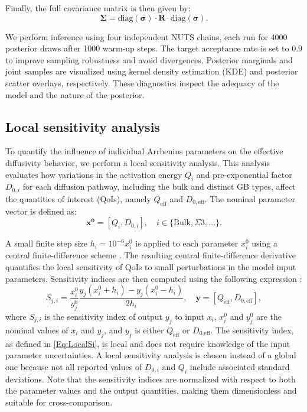 \documentclass[%
preprint,
amsmath,amssymb,
aps,
]{revtex4-2}
\newcommand{\?}{\stackrel{?}{=}}
\begin{document}
Finally, the full covariance matrix is then given by:
\begin{equation}
\boldsymbol{\Sigma} = \mathrm{diag}(\boldsymbol{\sigma}) \cdot \mathbf{R} \cdot \mathrm{diag}(\boldsymbol{\sigma}).
\end{equation}

We perform inference using four independent NUTS chains, each run for 4000 posterior draws after 1000 warm-up steps. The target acceptance rate is set to 0.9 to improve sampling robustness and avoid divergences. Posterior marginals and joint samples are visualized using kernel density estimation (KDE) \cite{Smith2014} and posterior scatter overlays, respectively. These diagnostics inspect the adequacy of the model and the nature of the posterior.


\subsection{Local sensitivity analysis}

To quantify the influence of individual Arrhenius parameters on the effective diffusivity behavior, we perform a local sensitivity analysis. This analysis evaluates how variations in the activation energy \( Q_i \) and pre-exponential factor \( D_{0,i} \) for each diffusion pathway, including the bulk and distinct GB types, affect the quantities of interest (QoIs), namely $Q_{\text{eff}}$ and $D_{0,\text{eff}}$. The nominal parameter vector is defined as:
\begin{equation}
\mathbf{x^0} = [Q_i, D_{0,i}], \quad i \in \{\text{Bulk}, \Sigma3, \dots\}.
\end{equation}

A small finite step size $h_i = 10^{-6} x_i^0$ is applied to each parameter $x_i^0$ using a central finite-difference scheme \cite{McClarren2018}. The resulting central finite-difference derivative quantifies the local sensitivity of QoIs to small perturbations in the model input parameters. Sensitivity indices are then computed using the following expression \cite{Saltelli2004}:
\begin{equation}
S_{j,i} = \frac{x_i^0}{y_j^0} \frac{y_j(x_i^0 + h_i) - y_j(x_i^0 - h_i)}{2h_i}, \quad \mathbf{y} = [Q_{\text{eff}}, D_{0,\text{eff}}],
\label{Eq:LocalSi}
\end{equation}
where $S_{j,i}$ is the sensitivity index of output $y_j$ to input $x_i$, $x_i^0$ and $y_j^0$ are the nominal values of $x_i$ and $y_j$, and $y_j$ is either $Q_\text{eff}$ or $D_\text{0,eff}$. The sensitivity index, as defined in \cref{Eq:LocalSi}, is local and does not require knowledge of the input parameter uncertainties. A local sensitivity analysis is chosen instead of a global one because not all reported values of $D_{0, i}$ and $Q_i$ include associated standard deviations. Note that the sensitivity indices are normalized with respect to both the parameter values and the output quantities, making them dimensionless and suitable for cross-comparison.
\end{document}

